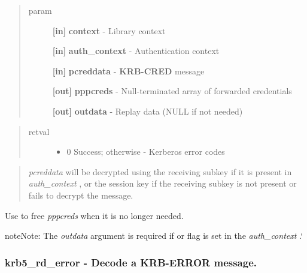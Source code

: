 \documentclass[letterpaper,10pt,english]{sphinxmanual}
\begin{document}
\begin{quote}\begin{description}
\item[{param}] \leavevmode
\textbf{{[}in{]}} \textbf{context} - Library context

\textbf{{[}in{]}} \textbf{auth\_context} - Authentication context

\textbf{{[}in{]}} \textbf{pcreddata} - \textbf{KRB-CRED} message

\textbf{{[}out{]}} \textbf{pppcreds} - Null-terminated array of forwarded credentials

\textbf{{[}out{]}} \textbf{outdata} - Replay data (NULL if not needed)

\end{description}\end{quote}
\begin{quote}\begin{description}
\item[{retval}] \leavevmode\begin{itemize}
\item {} 
0   Success; otherwise - Kerberos error codes

\end{itemize}

\end{description}\end{quote}
\begin{quote}

\emph{pcreddata} will be decrypted using the receiving subkey if it is present in \emph{auth\_context} , or the session key if the receiving subkey is not present or fails to decrypt the message.
\end{quote}

Use {\hyperref[appdev/refs/api/krb5_free_tgt_creds:c.krb5_free_tgt_creds]{}} to free \emph{pppcreds} when it is no longer needed.

\begin{notice}{note}{Note:}
The \emph{outdata} argument is required if {\hyperref[appdev/refs/macros/KRB5_AUTH_CONTEXT_RET_TIME:KRB5_AUTH_CONTEXT_RET_TIME]{}} or {\hyperref[appdev/refs/macros/KRB5_AUTH_CONTEXT_RET_SEQUENCE:KRB5_AUTH_CONTEXT_RET_SEQUENCE]{}} flag is set in the \emph{auth\_context} .{}`
\end{notice}


\subsubsection{krb5\_rd\_error -  Decode a KRB-ERROR message.}
\label{appdev/refs/api/krb5_rd_error:krb5-rd-error-decode-a-krb-error-message}\label{appdev/refs/api/krb5_rd_error::doc}
\end{document}
